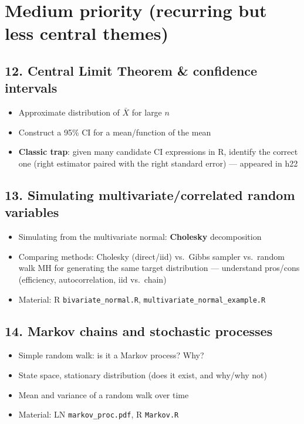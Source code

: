 \documentclass[11pt]{article}
\begin{document}
\section*{\textcolor{prilow}{Medium priority (recurring but less central themes)}}

\subsection*{12. Central Limit Theorem \& confidence intervals}
\begin{itemize}[leftmargin=*]
  \item Approximate distribution of $\bar X$ for large $n$
  \item Construct a 95\% CI for a mean/function of the mean
  \item \textbf{Classic trap}: given many candidate CI expressions in R, identify the correct
  one (right estimator paired with the right standard error) --- appeared in h22
\end{itemize}

\subsection*{13. Simulating multivariate/correlated random variables}
\begin{itemize}[leftmargin=*]
  \item Simulating from the multivariate normal: \textbf{Cholesky} decomposition
  \item Comparing methods: Cholesky (direct/iid) vs.\ Gibbs sampler vs.\ random walk MH for
  generating the same target distribution --- understand pros/cons (efficiency,
  autocorrelation, iid vs.\ chain)
  \item Material: R \texttt{bivariate\_normal.R}, \texttt{multivariate\_normal\_example.R}
\end{itemize}

\subsection*{14. Markov chains and stochastic processes}
\begin{itemize}[leftmargin=*]
  \item Simple random walk: is it a Markov process? Why?
  \item State space, stationary distribution (does it exist, and why/why not)
  \item Mean and variance of a random walk over time
  \item Material: LN \texttt{markov\_proc.pdf}, R \texttt{Markov.R}
\end{itemize}
\end{document}
